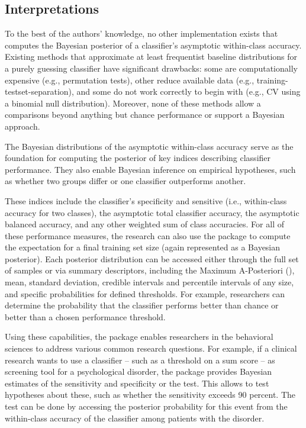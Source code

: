 \documentclass[man]{apa7}
\begin{document}
\subsection{Interpretations} \label{sec:interpretations}
To the best of the authors’ knowledge, no other implementation exists that computes the Bayesian posterior of a classifier’s asymptotic within-class accuracy. Existing methods that approximate at least frequentist baseline distributions for a purely guessing classifier have significant drawbacks: some are computationally expensive (e.g., permutation tests), other reduce available data (e.g., training-testset-separation), and some do not work correctly to begin with (e.g., CV using a binomial null distribution). Moreover, none of these methods allow a comparisons beyond anything but chance performance or support a Bayesian approach.

The Bayesian distributions of the asymptotic within-class accuracy serve as the foundation for computing the posterior of key indices describing classifier performance. They also enable Bayesian inference on empirical hypotheses, such as whether two groups differ or one classifier outperforms another.

These indices include the classifier’s specificity and sensitive (i.e., within-class accuracy for two classes), the asymptotic total classifier accuracy, the asymptotic balanced accuracy, and any other weighted sum of class accuracies. For all of these performance measures, the research can also use the package to compute the expectation for a final training set size (again represented as a Bayesian posterior). Each posterior distribution can be accessed either through the full set of samples or via summary descriptors, including the Maximum A-Posteriori (), mean, standard deviation, credible intervals and percentile intervals of any size, and specific probabilities for defined thresholds. For example, researchers can determine the probability that the classifier performs better than chance or better than a chosen performance threshold.

Using these capabilities, the package enables researchers in the behavioral sciences to address various common research questions. For example, if a clinical research wants to use a classifier – such as a threshold on a sum score – as screening tool for a psychological disorder, the package provides Bayesian estimates of the sensitivity and specificity or the test. This allows to test hypotheses about these, such as whether the sensitivity exceeds 90 percent. The test can be done by accessing the posterior probability for this event from the within-class accuracy of the classifier among patients with the disorder.
\end{document}
